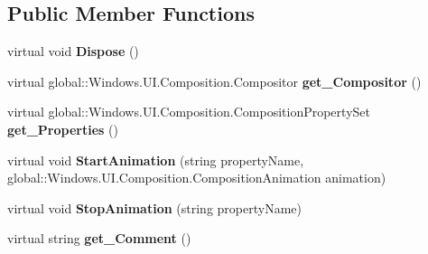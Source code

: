 \subsection*{Public Member Functions}
\begin{DoxyCompactItemize}
\item 
\mbox{\label{class_windows_1_1_u_i_1_1_composition_1_1_composition_object_a443e6ebcc8d54382c90b7a6309ef1b1f}} 
virtual void {\bfseries Dispose} ()
\item 
\mbox{\label{class_windows_1_1_u_i_1_1_composition_1_1_composition_object_a02238179cbd70c9e4a518009d12e39e7}} 
virtual global\+::\+Windows.\+U\+I.\+Composition.\+Compositor {\bfseries get\+\_\+\+Compositor} ()
\item 
\mbox{\label{class_windows_1_1_u_i_1_1_composition_1_1_composition_object_a365892d3180752a586915b7673ffda82}} 
virtual global\+::\+Windows.\+U\+I.\+Composition.\+Composition\+Property\+Set {\bfseries get\+\_\+\+Properties} ()
\item 
\mbox{\label{class_windows_1_1_u_i_1_1_composition_1_1_composition_object_af5a951dd44f067e4376daa62bcd893a1}} 
virtual void {\bfseries Start\+Animation} (string property\+Name, global\+::\+Windows.\+U\+I.\+Composition.\+Composition\+Animation animation)
\item 
\mbox{\label{class_windows_1_1_u_i_1_1_composition_1_1_composition_object_a1cd6b40941abd315607a06f492a8bc8f}} 
virtual void {\bfseries Stop\+Animation} (string property\+Name)
\item 
\mbox{\label{class_windows_1_1_u_i_1_1_composition_1_1_composition_object_ae75723b4139b9231f070eeeff95eb764}} 
virtual string {\bfseries get\+\_\+\+Comment} ()
\item 
\mbox{\label{class_windows_1_1_u_i_1_1_composition_1_1_composition_object_a489899a008945284e6ce17e08c880cb7}} 

\end{DoxyCompactItemize}
